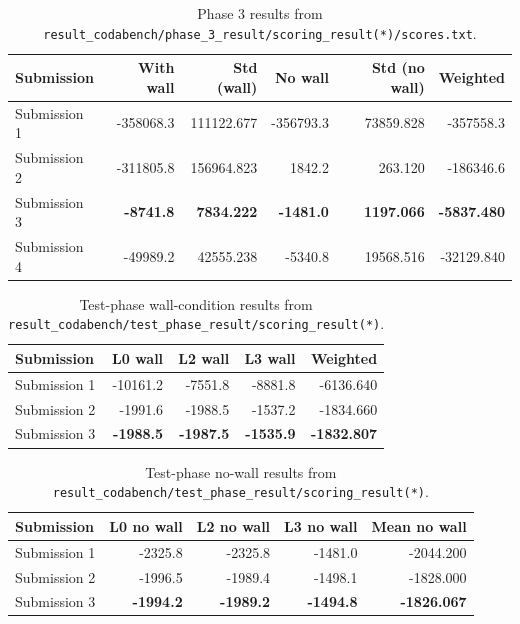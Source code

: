 \documentclass[11pt,oneside]{article}
\begin{document}
\begin{table}[h]
\centering
\small
\caption{Phase 3 results from \texttt{result\_codabench/phase\_3\_result/scoring\_result(*)/scores.txt}.}
\label{tab:phase3results}
\begin{tabular}{lrrrrr}
\toprule
Submission & With wall & Std (wall) & No wall & Std (no wall) & Weighted \\
\midrule
Submission 1 & -358068.3 & 111122.677 & -356793.3 & 73859.828 & -357558.3 \\
Submission 2 & -311805.8 & 156964.823 & 1842.2 & 263.120 & -186346.6 \\
Submission 3 & \textbf{-8741.8} & \textbf{7834.222} & \textbf{-1481.0} & \textbf{1197.066} & \textbf{-5837.480} \\
Submission 4 & -49989.2 & 42555.238 & -5340.8 & 19568.516 & -32129.840 \\
\bottomrule
\end{tabular}
\end{table}

\begin{table}[h]
\centering
\small
\caption{Test-phase wall-condition results from \texttt{result\_codabench/test\_phase\_result/scoring\_result(*)}.}
\label{tab:testphasewall}
\begin{tabular}{lrrrr}
\toprule
Submission & L0 wall & L2 wall & L3 wall & Weighted \\
\midrule
Submission 1 & -10161.2 & -7551.8 & -8881.8 & -6136.640 \\
Submission 2 & -1991.6 & -1988.5 & -1537.2 & -1834.660 \\
Submission 3 & \textbf{-1988.5} & \textbf{-1987.5} & \textbf{-1535.9} & \textbf{-1832.807} \\
\bottomrule
\end{tabular}
\end{table}

\begin{table}[h]
\centering
\small
\caption{Test-phase no-wall results from \texttt{result\_codabench/test\_phase\_result/scoring\_result(*)}.}
\label{tab:testphasenowall}
\begin{tabular}{lrrrr}
\toprule
Submission & L0 no wall & L2 no wall & L3 no wall & Mean no wall \\
\midrule
Submission 1 & -2325.8 & -2325.8 & -1481.0 & -2044.200 \\
Submission 2 & -1996.5 & -1989.4 & -1498.1 & -1828.000 \\
Submission 3 & \textbf{-1994.2} & \textbf{-1989.2} & \textbf{-1494.8} & \textbf{-1826.067} \\
\bottomrule
\end{tabular}
\end{table}
\end{document}
